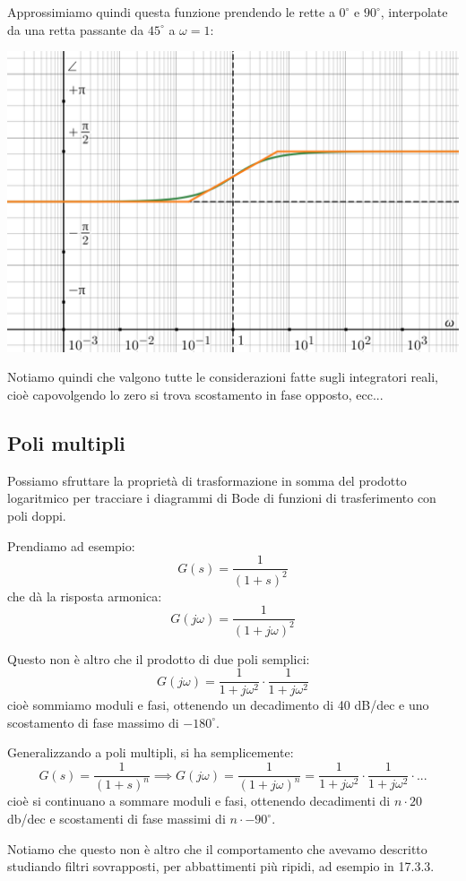 \documentclass[a4paper,11pt]{article}
\begin{document}
\noindent
\begin{minipage}{\textwidth}
Approssimiamo quindi questa funzione prendendo le rette a $0^\circ$ e $90^\circ$, interpolate da una retta passante da $45^\circ$ a $\omega = 1$:
\begin{center}
	\includegraphics[scale=0.3]{../figures/rdifferentiator_bode/phase.png}
\end{center}
\end{minipage}

\par\medskip

Notiamo quindi che valgono tutte le considerazioni fatte sugli integratori reali, cioè capovolgendo lo zero si trova scostamento in fase opposto, ecc...

\subsection{Poli multipli}
Possiamo sfruttare la proprietà di trasformazione in somma del prodotto logaritmico per tracciare i diagrammi di Bode di funzioni di trasferimento con poli doppi.

Prendiamo ad esempio: 
$$
G(s) = \frac{1}{(1 + s)^2}
$$
che dà la risposta armonica:
$$
G(j \omega) = \frac{1}{(1 + j \omega)^2}
$$

Questo non è altro che il prodotto di due poli semplici:
$$
G(j \omega) = \frac{1}{1 + j \omega^2} \cdot \frac{1}{1 + j \omega^2}
$$
cioè sommiamo moduli e fasi, ottenendo un decadimento di 40 dB/dec e uno scostamento di fase massimo di $-180^\circ$.

Generalizzando a poli multipli, si ha semplicemente:
$$
G(s) = \frac{1}{(1 + s)^n} \implies G(j \omega) = \frac{1}{(1 + j \omega)^n} = \frac{1}{1 + j \omega^2} \cdot \frac{1}{1 + j \omega^2} \cdot ...
$$
cioè si continuano a sommare moduli e fasi, ottenendo decadimenti di $n \cdot 20 $ db/dec e scostamenti di fase massimi di $n \cdot -90^\circ$.

Notiamo che questo non è altro che il comportamento che avevamo descritto studiando filtri sovrapposti, per abbattimenti più ripidi, ad esempio in 17.3.3.
\end{document}
